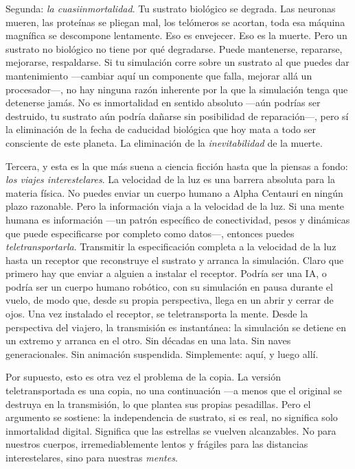 \documentclass[11pt, twoside, openright]{book}
\begin{document}
Segunda: \textit{la cuasiinmortalidad}. Tu sustrato biológico se degrada. Las neuronas mueren, las proteínas se pliegan mal, los telómeros se acortan, toda esa máquina magnífica se descompone lentamente. Eso es envejecer. Eso es la muerte. Pero un sustrato no biológico no tiene por qué degradarse. Puede mantenerse, repararse, mejorarse, respaldarse. Si tu simulación corre sobre un sustrato al que puedes dar mantenimiento ---cambiar aquí un componente que falla, mejorar allá un procesador---, no hay ninguna razón inherente por la que la simulación tenga que detenerse jamás. No es inmortalidad en sentido absoluto ---aún podrías ser destruido, tu sustrato aún podría dañarse sin posibilidad de reparación---, pero sí la eliminación de la fecha de caducidad biológica que hoy mata a todo ser consciente de este planeta. La eliminación de la \textit{inevitabilidad} de la muerte.

Tercera, y esta es la que más suena a ciencia ficción hasta que la piensas a fondo: \textit{los viajes interestelares}. La velocidad de la luz es una barrera absoluta para la materia física. No puedes enviar un cuerpo humano a Alpha Centauri en ningún plazo razonable. Pero la información viaja a la velocidad de la luz. Si una mente humana es información ---un patrón específico de conectividad, pesos y dinámicas que puede especificarse por completo como datos---, entonces puedes \textit{teletransportarla}. Transmitir la especificación completa a la velocidad de la luz hasta un receptor que reconstruye el sustrato y arranca la simulación. Claro que primero hay que enviar a alguien a instalar el receptor. Podría ser una IA, o podría ser un cuerpo humano robótico, con su simulación en pausa durante el vuelo, de modo que, desde su propia perspectiva, llega en un abrir y cerrar de ojos. Una vez instalado el receptor, se teletransporta la mente. Desde la perspectiva del viajero, la transmisión es instantánea: la simulación se detiene en un extremo y arranca en el otro. Sin décadas en una lata. Sin naves generacionales. Sin animación suspendida. Simplemente: aquí, y luego allí.

Por supuesto, esto es otra vez el problema de la copia. La versión teletransportada es una copia, no una continuación ---a menos que el original se destruya en la transmisión, lo que plantea sus propias pesadillas. Pero el argumento se sostiene: la independencia de sustrato, si es real, no significa solo inmortalidad digital. Significa que las estrellas se vuelven alcanzables. No para nuestros cuerpos, irremediablemente lentos y frágiles para las distancias interestelares, sino para nuestras \textit{mentes}.
\end{document}
